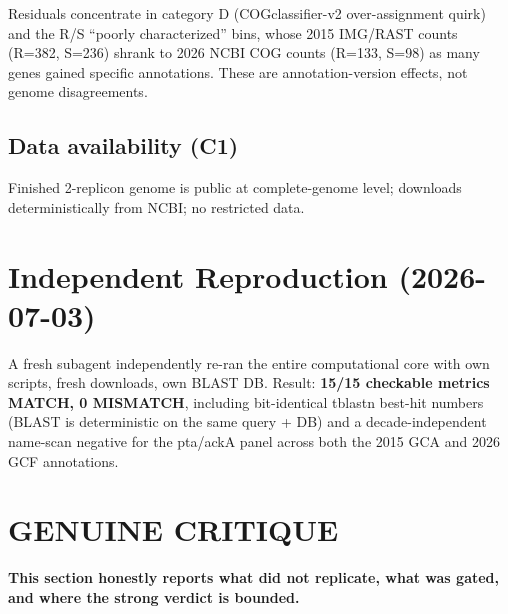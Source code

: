 \documentclass[11pt]{article}
\begin{document}
Residuals concentrate in category D (COGclassifier-v2 over-assignment quirk) and the R/S ``poorly characterized'' bins, whose 2015 IMG/RAST counts (R=382, S=236) shrank to 2026 NCBI COG counts (R=133, S=98) as many genes gained specific annotations. These are annotation-version effects, not genome disagreements.

\subsection{Data availability (C1)}
Finished 2-replicon genome is public at complete-genome level; downloads deterministically from NCBI; no restricted data.

\section{Independent Reproduction (2026-07-03)}
A fresh subagent independently re-ran the entire computational core with own scripts, fresh downloads, own BLAST DB. Result: \textbf{15/15 checkable metrics MATCH, 0 MISMATCH}, including bit-identical tblastn best-hit numbers (BLAST is deterministic on the same query + DB) and a decade-independent name-scan negative for the pta/ackA panel across both the 2015 GCA and 2026 GCF annotations.

\section{GENUINE CRITIQUE}
\textbf{This section honestly reports what did not replicate, what was gated, and where the strong verdict is bounded.}
\end{document}
